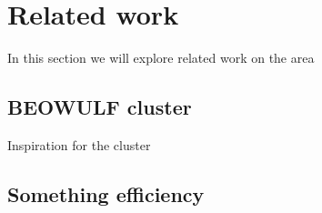 \section{Related work}
In this section we will explore related work on the area
\subsection{BEOWULF cluster}
Inspiration for the cluster\cite{RPI_BEOWULF}
\subsection{Something efficiency}
